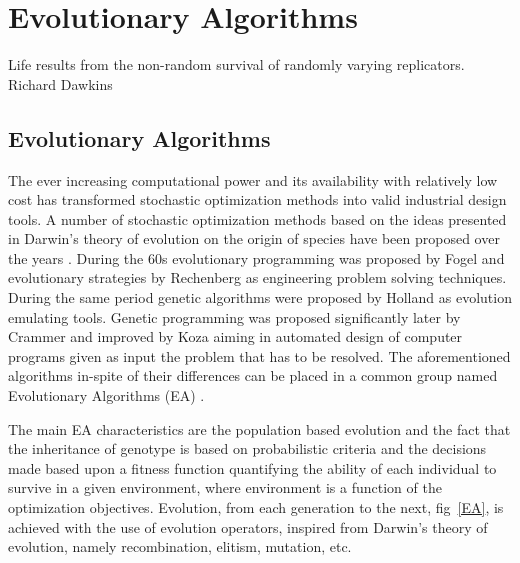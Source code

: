 \chapter{Evolutionary Algorithms} %


\ifpdf
    \graphicspath{{2/figures/PNG/}{2/figures/PDF/}{2/figures/}}
\else
    \graphicspath{{2/figures/EPS/}{2/figures/}}
\fi


\begin{flushright}
Life results from the non-random survival 
\linebreak
of randomly varying replicators.
\linebreak
Richard Dawkins 
\end{flushright}
\section{Evolutionary Algorithms}
The ever increasing computational power and its availability with relatively low cost has transformed stochastic optimization methods into valid industrial design tools. A number of stochastic optimization methods based on the ideas presented   
in Darwin's theory of evolution on the origin of species \cite{Darwin} have been proposed over the years \cite{Back1996}. During the 60s evolutionary programming was proposed by Fogel \cite{Fogel} and evolutionary strategies by Rechenberg \cite{Rechenberg} as engineering problem solving techniques. During the same period genetic algorithms were proposed by Holland \cite{holland_1975} as evolution emulating tools. Genetic programming was proposed significantly later by Crammer \cite{cramer85} and improved by Koza \cite{Koz94} aiming in automated design of computer programs given as input the problem that has to be resolved. The aforementioned algorithms in-spite of their differences can be placed in a common group named Evolutionary Algorithms (EA) \cite{Back1996}. 


The main EA characteristics are the population based evolution and the fact that the inheritance of genotype is based on probabilistic criteria and the decisions made based upon a fitness function quantifying the ability of each individual to survive in a given environment, where environment is a function of the optimization objectives. Evolution, from each generation to the next, fig~\ref{EA}, is achieved with the use of evolution operators, inspired from Darwin's theory of evolution, namely recombination, elitism, mutation, etc. 

